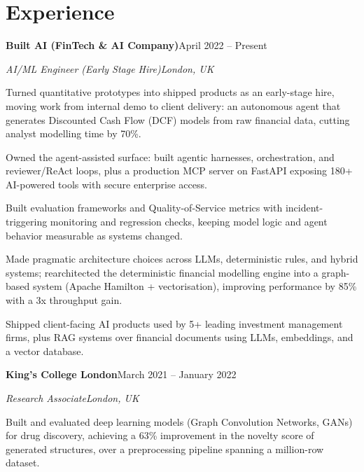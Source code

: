 \documentclass[10pt,a4paper]{article}
\newcommand{\entry}[4]{%
  {\color{company}\bfseries #1}\hfill {\color{muted}#2}\par
  \vspace{1pt}
  {\itshape #3}\hfill {\color{muted}\itshape #4}\par
  \vspace{3pt}%
}
\begin{document}
\section{Experience}
\entry{Built AI (FinTech \& AI Company)}{April 2022 -- Present}{AI/ML Engineer (Early Stage Hire)}{London, UK}
\begin{tight}
  \item Turned quantitative prototypes into shipped products as an early-stage hire, moving work from internal demo to client delivery: an autonomous agent that generates Discounted Cash Flow (DCF) models from raw financial data, cutting analyst modelling time by 70\%.
  \item Owned the agent-assisted surface: built agentic harnesses, orchestration, and reviewer/ReAct loops, plus a production MCP server on FastAPI exposing 180+ AI-powered tools with secure enterprise access.
  \item Built evaluation frameworks and Quality-of-Service metrics with incident-triggering monitoring and regression checks, keeping model logic and agent behavior measurable as systems changed.
  \item Made pragmatic architecture choices across LLMs, deterministic rules, and hybrid systems; rearchitected the deterministic financial modelling engine into a graph-based system (Apache Hamilton + vectorisation), improving performance by 85\% with a 3x throughput gain.
  \item Shipped client-facing AI products used by 5+ leading investment management firms, plus RAG systems over financial documents using LLMs, embeddings, and a vector database.
\end{tight}

\entry{King's College London}{March 2021 -- January 2022}{Research Associate}{London, UK}
\begin{tight}
  \item Built and evaluated deep learning models (Graph Convolution Networks, GANs) for drug discovery, achieving a 63\% improvement in the novelty score of generated structures, over a preprocessing pipeline spanning a million-row dataset.
\end{tight}

\end{document}

